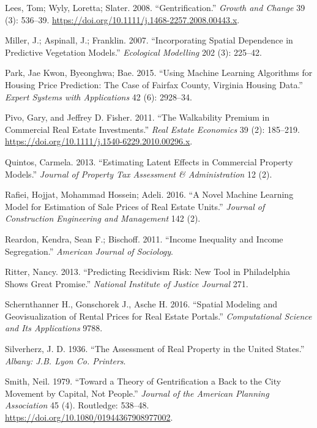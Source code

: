 \documentclass[12pt,]{article}
\begin{document}
\leavevmode\hypertarget{ref-Lees2008}{}%
Lees, Tom; Wyly, Loretta; Slater. 2008. ``Gentrification.'' \emph{Growth
and Change} 39 (3): 536--39.
\url{https://doi.org/10.1111/j.1468-2257.2008.00443.x}.

\leavevmode\hypertarget{ref-Miller2015}{}%
Miller, J.; Aspinall, J.; Franklin. 2007. ``Incorporating Spatial
Dependence in Predictive Vegetation Models.'' \emph{Ecological
Modelling} 202 (3): 225--42.

\leavevmode\hypertarget{ref-Park2015}{}%
Park, Jae Kwon, Byeonghwa; Bae. 2015. ``Using Machine Learning
Algorithms for Housing Price Prediction: The Case of Fairfax County,
Virginia Housing Data.'' \emph{Expert Systems with Applications} 42 (6):
2928--34.

\leavevmode\hypertarget{ref-Pivo2011}{}%
Pivo, Gary, and Jeffrey D. Fisher. 2011. ``The Walkability Premium in
Commercial Real Estate Investments.'' \emph{Real Estate Economics} 39
(2): 185--219. \url{https://doi.org/10.1111/j.1540-6229.2010.00296.x}.

\leavevmode\hypertarget{ref-Quintos2013}{}%
Quintos, Carmela. 2013. ``Estimating Latent Effects in Commercial
Property Models.'' \emph{Journal of Property Tax Assessment \&
Administration} 12 (2).

\leavevmode\hypertarget{ref-Rafiei2016}{}%
Rafiei, Hojjat, Mohammad Hossein; Adeli. 2016. ``A Novel Machine
Learning Model for Estimation of Sale Prices of Real Estate Units.''
\emph{Journal of Construction Engineering and Management} 142 (2).

\leavevmode\hypertarget{ref-Reardon2011}{}%
Reardon, Kendra, Sean F.; Bischoff. 2011. ``Income Inequality and Income
Segregation.'' \emph{American Journal of Sociology}.

\leavevmode\hypertarget{ref-Ritter2013}{}%
Ritter, Nancy. 2013. ``Predicting Recidivism Risk: New Tool in
Philadelphia Shows Great Promise.'' \emph{National Institute of Justice
Journal} 271.

\leavevmode\hypertarget{ref-Schernthanner2016}{}%
Schernthanner H., Gonschorek J., Asche H. 2016. ``Spatial Modeling and
Geovisualization of Rental Prices for Real Estate Portals.''
\emph{Computational Science and Its Applications} 9788.

\leavevmode\hypertarget{ref-Silverherz1936}{}%
Silverherz, J. D. 1936. ``The Assessment of Real Property in the United
States.'' \emph{Albany: J.B. Lyon Co. Printers}.

\leavevmode\hypertarget{ref-Smith1979}{}%
Smith, Neil. 1979. ``Toward a Theory of Gentrification a Back to the
City Movement by Capital, Not People.'' \emph{Journal of the American
Planning Association} 45 (4). Routledge: 538--48.
\url{https://doi.org/10.1080/01944367908977002}.
\end{document}
